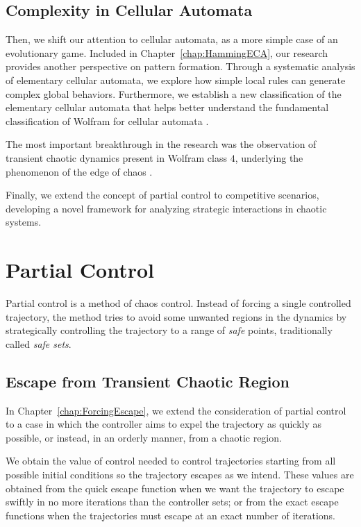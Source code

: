 \subsection{Complexity in Cellular Automata}

Then, we shift our attention to cellular automata, as a more simple case of an evolutionary game. Included in Chapter~\ref{chap:HammingECA}, our research provides another perspective on pattern formation. Through a systematic analysis of elementary cellular automata, we explore how simple local rules can generate complex global behaviors. Furthermore, we establish a new classification of the elementary cellular automata that helps better understand the fundamental classification of Wolfram for cellular automata \cite{WolframClass}.

The most important breakthrough in the research was the observation of transient chaotic dynamics present in Wolfram class $4$, underlying the phenomenon of the edge of chaos \cite{EdgeChaos}. 

Finally, we extend the concept of partial control \cite{Yorke,DynamicsPartialControl,PartialControlBeyond,PartialControlFunctions} to competitive scenarios, developing a novel framework for analyzing strategic interactions in chaotic systems. 

\section{Partial Control}

Partial control is a method of chaos control. Instead of forcing a single controlled trajectory, the method tries to avoid some unwanted regions in the dynamics by strategically controlling the trajectory to a range of \textit{safe} points, traditionally called \textit{safe sets}.

\subsection{Escape from Transient Chaotic Region}

In Chapter~\ref{chap:ForcingEscape}, we extend the consideration of partial control to a case in which the controller aims to expel the trajectory as quickly as possible, or instead, in an orderly manner, from a chaotic region. 

We obtain the value of control needed to control trajectories starting from all possible initial conditions so the trajectory escapes as we intend. These values are obtained from the quick escape function when we want the trajectory to escape swiftly in no more iterations than the controller sets; or from the exact escape functions when the trajectories must escape at an exact number of iterations.

